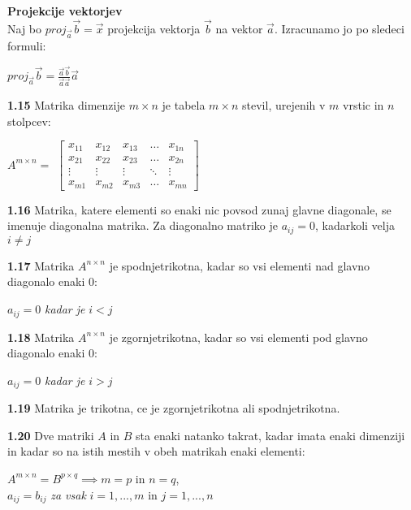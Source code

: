 \documentclass{article}
\begin{document}
\begin{multicols}{4}
	\textbf{Projekcije vektorjev}\\
	Naj bo $proj_{\vec{a}}\vec{b} = \vec{x}$ projekcija vektorja $\vec{b}$ na vektor $\vec{a}$.
	Izracunamo jo po sledeci formuli:
	\begin{center}
		\begin{math}
			proj_{\vec{a}}\vec{b} = \frac{\vec{a}\vec{b}}{\vec{a}\vec{a}} \vec{a}
		\end{math}
	\end{center}

	\textbf{1.15} Matrika dimenzije $m \times n$ je tabela $m \times n$ stevil, urejenih
	v $m$ vrstic in $n$ stolpcev:
	\begin{center}
		$A^{m \times n} =$
		$\begin{bmatrix}
				x_{11} & x_{12} & x_{13} & \dots  & x_{1n} \\
				x_{21} & x_{22} & x_{23} & \dots  & x_{2n} \\
				\vdots & \vdots & \vdots & \ddots & \vdots \\
				x_{m1} & x_{m2} & x_{m3} & \dots  & x_{mn}
			\end{bmatrix}$
	\end{center}

	\textbf{1.16} Matrika, katere elementi so enaki nic povsod
	zunaj glavne diagonale, se imenuje diagonalna matrika. Za
	diagonalno matriko je $a_{ij} = 0$, kadarkoli velja $i \neq j$

	\textbf{1.17} Matrika $A^{n \times n}$ je spodnjetrikotna, kadar
	so vsi elementi nad glavno diagonalo enaki 0:
	\begin{center}
		$a_{ij} = 0$  \textit{kadar je} $i < j$
	\end{center}

	\textbf{1.18} Matrika $A^{n \times n}$ je zgornjetrikotna, kadar
	so vsi elementi pod glavno diagonalo enaki 0:
	\begin{center}
		$a_{ij} = 0$  \textit{kadar je} $i > j$
	\end{center}

	\textbf{1.19} Matrika je trikotna, ce je zgornjetrikotna ali spodnjetrikotna.

	\textbf{1.20} Dve matriki $A$ in $B$ sta enaki natanko takrat,
	kadar imata enaki dimenziji in kadar so na istih mestih v obeh
	matrikah enaki elementi:
	\begin{center}
		$A^{m \times n} = B^{p \times q} \implies m=p$ in $n=q$,\\
		$a_{ij} = b_{ij}$ \textit{za vsak} $i= 1,...,m$ in $j=1,...,n$
	\end{center}


\end{multicols}
\end{document}
